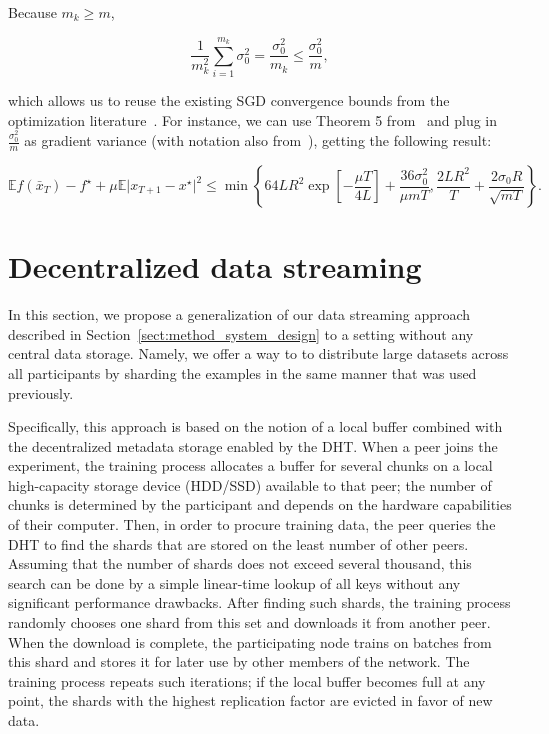 Because $m_k\geq m$,

\begin{equation}
    \frac{1}{m_k^2}\sum_{i=1}^{m_k}\sigma_0^2=\frac{\sigma_0^2}{m_k}\leq\frac{\sigma_0^2}{m},
\end{equation}

which allows us to reuse the existing SGD convergence bounds from the optimization literature~\cite{stich2019unified,khaled2020unified}. For instance, we can use Theorem 5 from~\cite{stich2019unified} and plug in $\frac{\sigma_0^2}{m}$ as gradient variance (with notation also from~\cite{stich2019unified}), getting the following result: 

\begin{equation}
    \mathbb{E}{ f(\bar x_T) - f^\star} + \mu \mathbb{E}{|x_{T+1}-x^\star}|^2 \leq \min \left\{ 64 L R^2 \exp \left[-\frac{\mu T}{4L} \right] + \frac{36 \sigma_0^2}{\mu m T} ,  \frac{2LR^2}{T} + \frac{2 \sigma_0 R}{\sqrt{mT}}  \right\}.
\end{equation}

\section{Decentralized data streaming}
\label{appendix:decentralized_dataset_streaming}
In this section, we propose a generalization of our data streaming approach described in Section~\ref{sect:method_system_design} to a setting without any central data storage. Namely, we offer a way to 
to distribute large datasets across all participants by sharding the examples in the same manner that was used previously.

Specifically, this approach is based on the notion of a local buffer combined with the decentralized metadata storage enabled by the DHT. When a peer joins the experiment, the training process allocates a buffer for several chunks on a local high-capacity storage device (HDD/SSD) available to that peer; the number of chunks is determined by the participant and depends on the hardware capabilities of their computer. Then, in order to procure training data, the peer queries the DHT to find the shards that are stored on the least number of other peers. Assuming that the number of shards does not exceed several thousand, this search can be done by a simple linear-time lookup of all keys without any significant performance drawbacks. After finding such shards, the training process randomly chooses one shard from this set and downloads it from another peer. When the download is complete, the participating node trains on batches from this shard and stores it for later use by other members of the network. The training process repeats such iterations; if the local buffer becomes full at any point, the shards with the highest replication factor are evicted in favor of new data.

